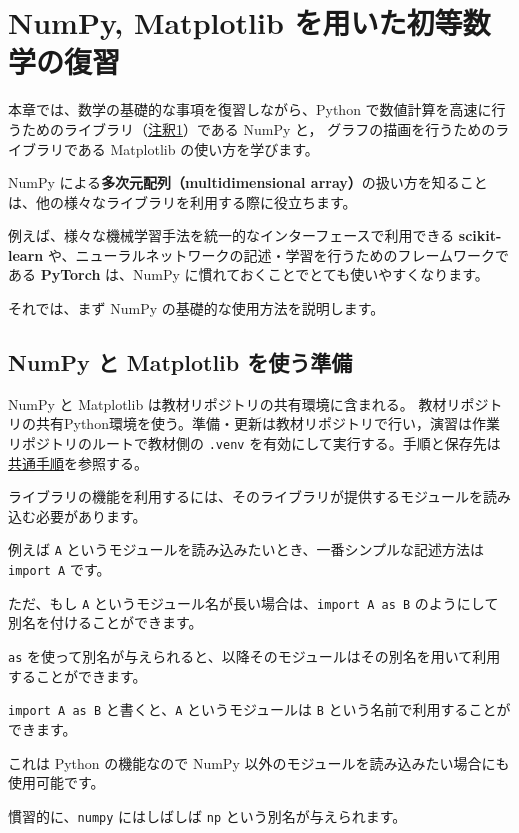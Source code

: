\chapter{NumPy, Matplotlib を用いた初等数学の復習}


本章では、数学の基礎的な事項を復習しながら、Python で数値計算を高速に行うためのライブラリ（\hyperref[03-reviewing-elementary-math-with-numpy-and-matplotlib-note1]{注釈1}）である NumPy と， グラフの描画を行うためのライブラリである Matplotlib の使い方を学びます。


NumPy による\textbf{多次元配列（multidimensional array）}の扱い方を知ることは、他の様々なライブラリを利用する際に役立ちます。

例えば、様々な機械学習手法を統一的なインターフェースで利用できる \textbf{scikit-learn} や、ニューラルネットワークの記述・学習を行うためのフレームワークである \textbf{PyTorch} は、NumPy に慣れておくことでとても使いやすくなります。


それでは、まず NumPy の基礎的な使用方法を説明します。


\section{NumPy と Matplotlib を使う準備}


NumPy と Matplotlib は教材リポジトリの共有環境に含まれる。
教材リポジトリの共有Python環境を使う。準備・更新は教材リポジトリで行い，演習は作業リポジトリのルートで教材側の \texttt{.venv} を有効にして実行する。手順と保存先は \href{https://github.com/ykinolab-tokai/signal-ml-training/blob/main/handouts/README.md}{共通手順}を参照する。

ライブラリの機能を利用するには、そのライブラリが提供するモジュールを読み込む必要があります。


例えば \texttt{A} というモジュールを読み込みたいとき、一番シンプルな記述方法は \texttt{import A} です。

ただ、もし \texttt{A} というモジュール名が長い場合は、\texttt{import A as B} のようにして別名を付けることができます。

\texttt{as} を使って別名が与えられると、以降そのモジュールはその別名を用いて利用することができます。

\texttt{import A as B} と書くと、\texttt{A} というモジュールは \texttt{B} という名前で利用することができます。

これは Python の機能なので NumPy 以外のモジュールを読み込みたい場合にも使用可能です。


慣習的に、\texttt{numpy} にはしばしば \texttt{np} という別名が与えられます。

